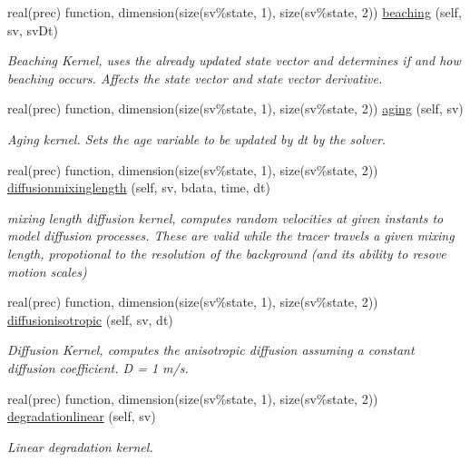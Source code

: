 \begin{DoxyCompactItemize}
real(prec) function, dimension(size(sv\%state, 1), size(sv\%state, 2)) \mbox{\hyperlink{namespacekernel__mod_ad243eaeb4e5d667795477e81ce6136c9}{beaching}} (self, sv, sv\+Dt)
\begin{DoxyCompactList}\small\item\em Beaching Kernel, uses the already updated state vector and determines if and how beaching occurs. Affects the state vector and state vector derivative. \end{DoxyCompactList}\item 
real(prec) function, dimension(size(sv\%state, 1), size(sv\%state, 2)) \mbox{\hyperlink{namespacekernel__mod_ac2352f3964b072607ed042e70a59b9f2}{aging}} (self, sv)
\begin{DoxyCompactList}\small\item\em Aging kernel. Sets the age variable to be updated by dt by the solver. \end{DoxyCompactList}\item 
real(prec) function, dimension(size(sv\%state, 1), size(sv\%state, 2)) \mbox{\hyperlink{namespacekernel__mod_a065d7965d3a572a524cfd6bdd4729898}{diffusionmixinglength}} (self, sv, bdata, time, dt)
\begin{DoxyCompactList}\small\item\em mixing length diffusion kernel, computes random velocities at given instants to model diffusion processes. These are valid while the tracer travels a given mixing length, propotional to the resolution of the background (and its ability to resove motion scales) \end{DoxyCompactList}\item 
real(prec) function, dimension(size(sv\%state, 1), size(sv\%state, 2)) \mbox{\hyperlink{namespacekernel__mod_a92805ef71e30527b27de4efd7561f8f7}{diffusionisotropic}} (self, sv, dt)
\begin{DoxyCompactList}\small\item\em Diffusion Kernel, computes the anisotropic diffusion assuming a constant diffusion coefficient. D = 1 m/s. \end{DoxyCompactList}\item 
real(prec) function, dimension(size(sv\%state, 1), size(sv\%state, 2)) \mbox{\hyperlink{namespacekernel__mod_a43899c5dd3f82ed3dc4aade9aefd7a44}{degradationlinear}} (self, sv)
\begin{DoxyCompactList}\small\item\em Linear degradation kernel. \end{DoxyCompactList}\item 

\end{DoxyCompactItemize}
